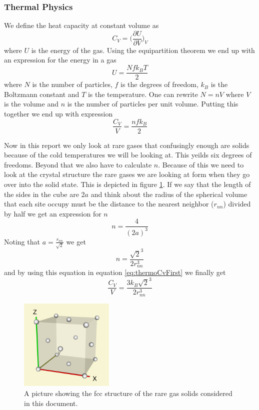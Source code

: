 \documentclass[11pt]{article}
\begin{document}
\subsubsection{Thermal Physics}
We define the heat capacity at constant volume as
\begin{equation}
	C_V = \Big(\frac{\partial U}{\partial V}\Big)_V
\end{equation}
where $U$ is the energy of the gas. Using the equipartition theorem we end up with an expression for the energy in a gas\cite{bib:thermo}
\begin{equation}
	U = \frac{Nfk_BT}{2}
\end{equation}
where $N$ is the number of particles, $f$ is the degrees of freedom, $k_B$ is the Boltzmann constant and $T$ is the temperature.  One can rewrite $N = nV$ where $V$ is the volume and $n$ is the number of particles per unit volume. Putting this together we end up with expression
\begin{equation}
	\frac{C_V}{V} = \frac{nfk_B}{2}
	\label{eq:thermoCvFirst}
\end{equation}

Now in this report we only look at rare gases that confusingly enough are solids because of the cold temperatures we will be looking at. This yeilds six degrees of freedoms. Beyond that we also have to calculate $n$. Because of this we need to look at the crystal structure the rare gases we are looking at form when they go over into the solid state. This is depicted in figure \ref{fig:fcc}. If we say that the length of the sides in the cube are 2$a$  and think about the radius of the spherical volume that each site occupy must be the distance to the nearest neighbor ($r_{nn}$) divided by half we get an expression for $n$
\begin{equation}
	n = \frac{4}{(2a)^3}
\end{equation}
Noting that $a = \frac{r_{nn}}{\sqrt{2}}$ we get
\begin{equation}
	n = \frac{\sqrt{2}^3}{2r_{nn}^3}
	\label{eq:n}
\end{equation}
and by using this equation in equation \ref{eq:thermoCvFirst} we finally get 
\begin{equation}
	\frac{C_V}{V} = \frac{3k_B\sqrt{2}^3}{2r_{nn}^3}
	\label{eq:thermoCv}
\end{equation}

\begin{figure}[H]
	\centering
	\includegraphics[width=0.4\textwidth]{fcc.png}
	\caption{A picture showing the fcc structure of the rare gas solids considered in this document.}
	\label{fig:fcc}
\end{figure}
\end{document}
